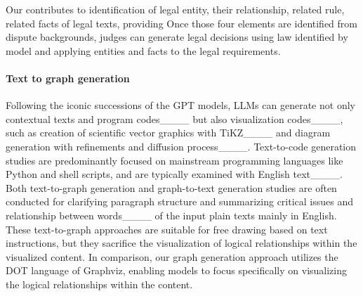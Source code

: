 \if[]
Our \datasetName contributes to identification of legal entity, their relationship, related rule, related facts of legal texts, providing 
Once those four elements are identified from dispute backgrounds, judges can generate legal decisions using law identified by model and applying entities and facts to the legal requirements.
\fi


\paragraph{Text to graph generation}
Following the iconic successions of the GPT models, LLMs can generate not only contextual texts and program codes____ but also visualization codes____, such as creation of scientific vector graphics with TiKZ____
and diagram generation with refinements and diffusion process____.
Text-to-code generation studies are predominantly focused on mainstream programming languages like Python and shell scripts, and are typically examined with English text____.
Both text-to-graph generation and graph-to-text generation studies are often conducted for clarifying paragraph structure and summarizing critical issues and relationship between words____ of the input plain texts mainly in English.
These text-to-graph approaches are suitable for free drawing based on text instructions, but they sacrifice the visualization of logical relationships within the visualized content. 
In comparison, our graph generation approach utilizes the DOT language of Graphviz, enabling models to focus specifically on visualizing the logical relationships within the content.